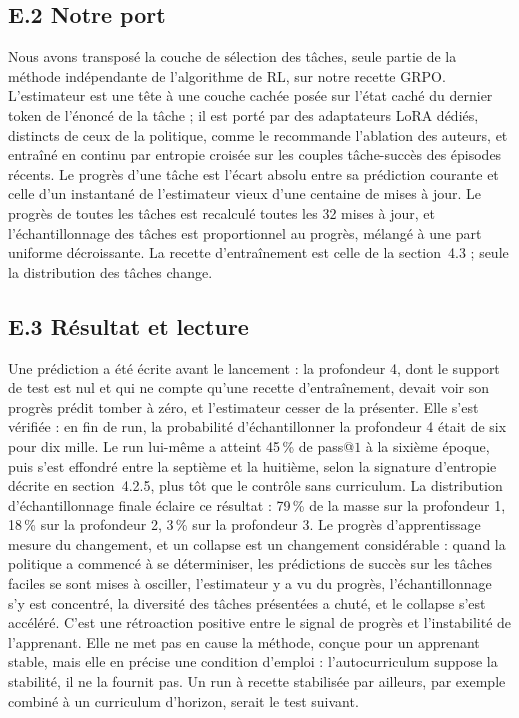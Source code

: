 \documentclass[11pt,a4paper]{article}
\begin{document}
\subsection*{E.2 Notre port}
Nous avons transposé la couche de sélection des tâches, seule partie de la méthode indépendante de l'algorithme de RL, sur notre recette GRPO. L'estimateur est une tête à une couche cachée posée sur l'état caché du dernier token de l'énoncé de la tâche ; il est porté par des adaptateurs LoRA dédiés, distincts de ceux de la politique, comme le recommande l'ablation des auteurs, et entraîné en continu par entropie croisée sur les couples tâche-succès des épisodes récents. Le progrès d'une tâche est l'écart absolu entre sa prédiction courante et celle d'un instantané de l'estimateur vieux d'une centaine de mises à jour. Le progrès de toutes les tâches est recalculé toutes les 32 mises à jour, et l'échantillonnage des tâches est proportionnel au progrès, mélangé à une part uniforme décroissante. La recette d'entraînement est celle de la section~4.3 ; seule la distribution des tâches change.

\subsection*{E.3 Résultat et lecture}
Une prédiction a été écrite avant le lancement : la profondeur 4, dont le support de test est nul et qui ne compte qu'une recette d'entraînement, devait voir son progrès prédit tomber à zéro, et l'estimateur cesser de la présenter. Elle s'est vérifiée : en fin de run, la probabilité d'échantillonner la profondeur 4 était de six pour dix mille. Le run lui-même a atteint 45\,\% de pass@$1$ à la sixième époque, puis s'est effondré entre la septième et la huitième, selon la signature d'entropie décrite en section~4.2.5, plus tôt que le contrôle sans curriculum. La distribution d'échantillonnage finale éclaire ce résultat : 79\,\% de la masse sur la profondeur 1, 18\,\% sur la profondeur 2, 3\,\% sur la profondeur 3. Le progrès d'apprentissage mesure du changement, et un collapse est un changement considérable : quand la politique a commencé à se déterminiser, les prédictions de succès sur les tâches faciles se sont mises à osciller, l'estimateur y a vu du progrès, l'échantillonnage s'y est concentré, la diversité des tâches présentées a chuté, et le collapse s'est accéléré. C'est une rétroaction positive entre le signal de progrès et l'instabilité de l'apprenant. Elle ne met pas en cause la méthode, conçue pour un apprenant stable, mais elle en précise une condition d'emploi : l'autocurriculum suppose la stabilité, il ne la fournit pas. Un run à recette stabilisée par ailleurs, par exemple combiné à un curriculum d'horizon, serait le test suivant.
\end{document}
